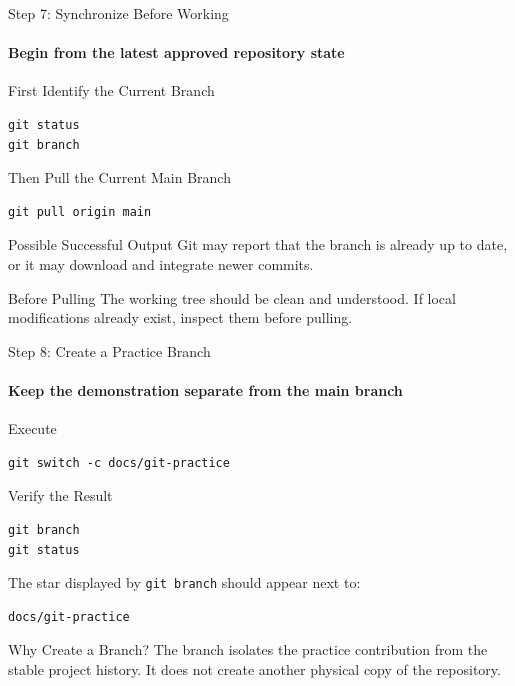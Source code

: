 \begin{frame}[fragile]{Step 7: Synchronize Before Working}
\framesubtitle{Begin from the latest approved repository state}

\footnotesize

\begin{block}{First Identify the Current Branch}
\begin{verbatim}
git status
git branch
\end{verbatim}
\end{block}

\begin{block}{Then Pull the Current Main Branch}
\begin{verbatim}
git pull origin main
\end{verbatim}
\end{block}

\begin{exampleblock}{Possible Successful Output}
Git may report that the branch is already up to date, or it may download
and integrate newer commits.
\end{exampleblock}

\begin{alertblock}{Before Pulling}
The working tree should be clean and understood. If local modifications
already exist, inspect them before pulling.
\end{alertblock}

\end{frame}

\begin{frame}[fragile]{Step 8: Create a Practice Branch}
\framesubtitle{Keep the demonstration separate from the main branch}

\footnotesize

\begin{block}{Execute}
\begin{verbatim}
git switch -c docs/git-practice
\end{verbatim}
\end{block}

\begin{exampleblock}{Verify the Result}
\begin{verbatim}
git branch
git status
\end{verbatim}

The star displayed by \texttt{git branch} should appear next to:

\begin{verbatim}
docs/git-practice
\end{verbatim}
\end{exampleblock}

\begin{alertblock}{Why Create a Branch?}
The branch isolates the practice contribution from the stable project
history. It does not create another physical copy of the repository.
\end{alertblock}

\end{frame}


